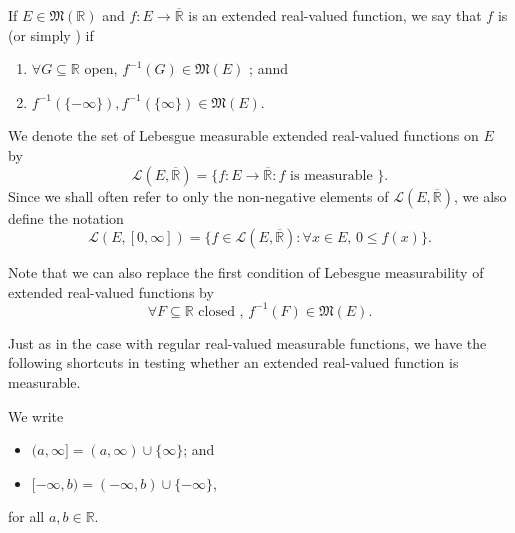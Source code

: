 \documentclass[notoc,notitlepage]{tufte-book}
\begin{document}
\begin{defn}\label{defn:measurable_extended_real_valued_function}
  If $E \in \mathfrak{M}(\mathbb{R})$ and $f : E \to \overline{\mathbb{R}}$ is
  an extended real-valued function, we say that $f$ is  (or simply ) if
  \begin{enumerate}
    \item $\forall G \subseteq \mathbb{R}$ open, $f^{-1}(G) \in
      \mathfrak{M}(E)$ ; annd
    \item $f^{-1}(\{-\infty\}), f^{-1}(\{\infty\}) \in \mathfrak{M}(E)$.
  \end{enumerate}

  We denote the set of Lebesgue measurable extended real-valued functions on $E$ 
  by
  \begin{equation*}
    \mathcal{L}(E, \overline{\mathbb{R}}) = \{ f : E \to \overline{\mathbb{R}} :
    f \text{ is measurable } \}.
  \end{equation*}
  Since we shall often refer to only the non-negative elements of
  $\mathcal{L}(E, \overline{\mathbb{R}})$, we also define the notation
  \begin{equation*}
    \mathcal{L}(E, [0, \infty]) = \{ f \in \mathcal{L}(E, \overline{\mathbb{R}})
    : \forall x \in E, \, 0 \leq f(x) \}.
  \end{equation*}
\end{defn}

\begin{note}
  Note that we can also replace the first condition of Lebesgue measurability of
  extended real-valued functions by
  \begin{equation*}
    \forall F \subseteq \mathbb{R} \text{ closed },\, f^{-1}(F) \in
    \mathfrak{M}(E).
  \end{equation*}
\end{note}

Just as in the case with regular real-valued measurable functions, we have the
following shortcuts in testing whether an extended real-valued function is
measurable.

\begin{notation}
  We write
  \begin{itemize}
    \item $(a, \infty] = (a, \infty) \cup \{ \infty \}$; and
    \item $[-\infty, b) = (-\infty, b) \cup \{ -\infty \}$,
  \end{itemize}
  for all $a, b \in \mathbb{R}$.
\end{notation}
\end{document}
